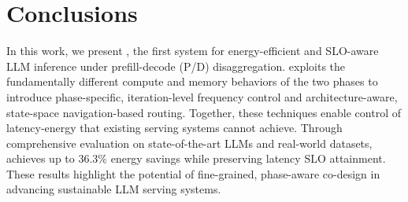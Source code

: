 \section{Conclusions}
\label{sec:conclusion}



In this work, we present \name, the first system for energy-efficient and SLO-aware LLM inference under prefill-decode (P/D) disaggregation.
\name exploits the fundamentally different compute and memory behaviors of the two phases to introduce phase-specific, iteration-level frequency control and architecture-aware, state-space navigation-based routing.
Together, these techniques enable  control of latency-energy that existing serving systems cannot achieve.
Through comprehensive evaluation on state-of-the-art LLMs and real-world datasets, \name achieves up to 36.3\% energy savings while preserving latency SLO attainment.
These results highlight the potential of fine-grained, phase-aware co-design in advancing sustainable LLM serving systems.


